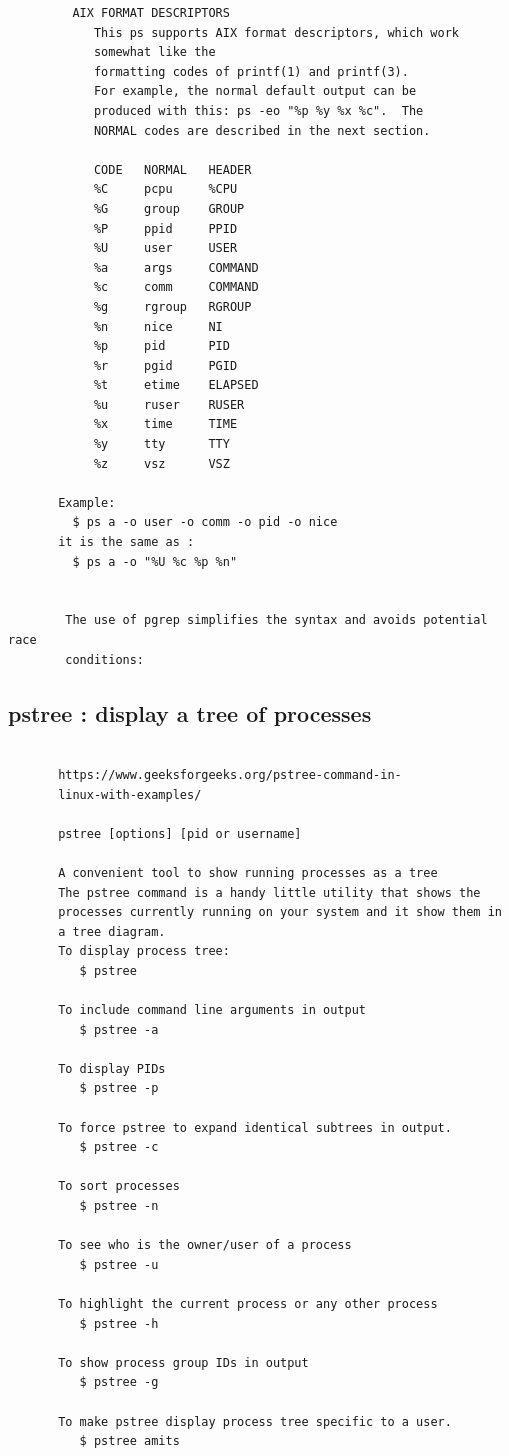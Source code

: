 \documentclass[a4paper,12pt]{article}
\begin{document}
\begin{verbatim}
         AIX FORMAT DESCRIPTORS
            This ps supports AIX format descriptors, which work
            somewhat like the            
            formatting codes of printf(1) and printf(3).  
            For example, the normal default output can be 
            produced with this: ps -eo "%p %y %x %c".  The
            NORMAL codes are described in the next section.

            CODE   NORMAL   HEADER
            %C     pcpu     %CPU
            %G     group    GROUP
            %P     ppid     PPID
            %U     user     USER
            %a     args     COMMAND
            %c     comm     COMMAND
            %g     rgroup   RGROUP
            %n     nice     NI
            %p     pid      PID
            %r     pgid     PGID
            %t     etime    ELAPSED
            %u     ruser    RUSER
            %x     time     TIME
            %y     tty      TTY
            %z     vsz      VSZ
       
       Example: 
         $ ps a -o user -o comm -o pid -o nice
       it is the same as :
         $ ps a -o "%U %c %p %n"
       
       
        The use of pgrep simplifies the syntax and avoids potential race 
        conditions:

\end{verbatim}

\subsection{pstree    : display a tree of processes}
\begin{verbatim}
       
       https://www.geeksforgeeks.org/pstree-command-in-
       linux-with-examples/
       
       pstree [options] [pid or username]
       
       A convenient tool to show running processes as a tree
       The pstree command is a handy little utility that shows the 
       processes currently running on your system and it show them in 
       a tree diagram. 
       To display process tree:
          $ pstree
       
       To include command line arguments in output
          $ pstree -a

       To display PIDs
          $ pstree -p

       To force pstree to expand identical subtrees in output.
          $ pstree -c

       To sort processes
          $ pstree -n
       
       To see who is the owner/user of a process
          $ pstree -u
          
       To highlight the current process or any other process
          $ pstree -h  
          
       To show process group IDs in output
          $ pstree -g   
          
       To make pstree display process tree specific to a user.
          $ pstree amits   
           
          
\end{verbatim}
\end{document}
